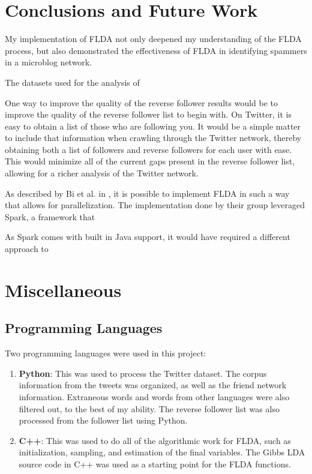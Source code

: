 \documentclass[a4paper]{article}
\begin{document}
\section{Conclusions and Future Work}
\label{sec:conc}
My implementation of FLDA not only deepened my understanding of the FLDA process, but also demonstrated the effectiveness of FLDA in identifying spammers in a microblog network. 

The datasets used for the analysis of 

One way to improve the quality of the reverse follower results would be to improve the quality of the reverse follower list to begin with. On Twitter, it is easy to obtain a list of those who are following you. It would be a simple matter to include that information when crawling through the Twitter network, thereby obtaining both a list of followers and reverse followers for each user with ease. This would minimize all of the current gaps present in the reverse follower list, allowing for a richer analysis of the Twitter network.

As described by Bi et al. in \cite{flda}, it is possible to implement FLDA in such a way that allows for parallelization. The implementation done by their group leveraged Spark, a framework that 

As Spark comes with built in Java support, it would have required a different approach to 

\section{Miscellaneous}
\label{sec:misc}
\subsection{Programming Languages}
Two programming languages were used in this project:
\begin{enumerate}
\item \textbf{Python}: This was used to process the Twitter dataset. The corpus information from the tweets was organized, as well as the friend network information. Extraneous words and words from other languages were also filtered out, to the best of my ability. The reverse follower list was also processed from the follower list using Python.
\item \textbf{C++}: This was used to do all of the algorithmic work for FLDA, such as initialization, sampling, and estimation of the final variables. The Gibbs LDA source code in C++ was used as a starting point for the FLDA functions.
\end{enumerate}
\end{document}
